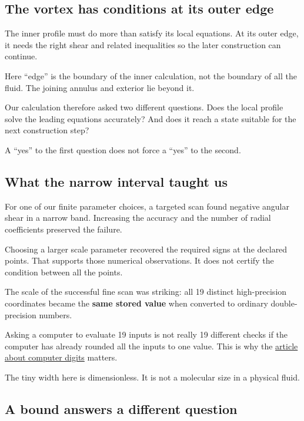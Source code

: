 \documentclass[
  english,
  11pt,
]{article}
\begin{document}
\subsection{The vortex has conditions at its outer
edge}\label{the-vortex-has-conditions-at-its-outer-edge}

The inner profile must do more than satisfy its local equations. At its
outer edge, it needs the right shear and related inequalities so the
later construction can continue.

Here ``edge'' is the boundary of the inner calculation, not the boundary
of all the fluid. The joining annulus and exterior lie beyond it.

Our calculation therefore asked two different questions. Does the local
profile solve the leading equations accurately? And does it reach a
state suitable for the next construction step?

A ``yes'' to the first question does not force a ``yes'' to the second.

\subsection{What the narrow interval taught
us}\label{what-the-narrow-interval-taught-us}

For one of our finite parameter choices, a targeted scan found negative
angular shear in a narrow band. Increasing the accuracy and the number
of radial coefficients preserved the failure.

Choosing a larger scale parameter recovered the required signs at the
declared points. That supports those numerical observations. It does not
certify the condition between all the points.

The scale of the successful fine scan was striking: all 19 distinct
high-precision coordinates became the \textbf{same stored value} when
converted to ordinary double-precision numbers.

Asking a computer to evaluate 19 inputs is not really 19 different
checks if the computer has already rounded all the inputs to one value.
This is why the \href{../d7_conditioning/article.html}{article about
computer digits} matters.

The tiny width here is dimensionless. It is not a molecular size in a
physical fluid.

\subsection{A bound answers a different
question}\label{a-bound-answers-a-different-question}
\end{document}
